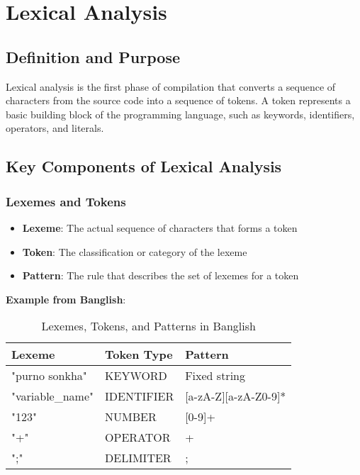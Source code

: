\documentclass[12pt,a4paper]{article}
\begin{document}
\section{Lexical Analysis}

\subsection{Definition and Purpose}

Lexical analysis is the first phase of compilation that converts a sequence of characters from the source code into a sequence of tokens. A token represents a basic building block of the programming language, such as keywords, identifiers, operators, and literals.

\subsection{Key Components of Lexical Analysis}

\subsubsection{Lexemes and Tokens}

\begin{itemize}
    \item \textbf{Lexeme}: The actual sequence of characters that forms a token
    \item \textbf{Token}: The classification or category of the lexeme
    \item \textbf{Pattern}: The rule that describes the set of lexemes for a token
\end{itemize}

\textbf{Example from Banglish}:
\begin{table}[H]
\centering
\begin{tabular}{|p{3.5cm}|p{3cm}|p{6cm}|}
\hline
\rowcolor{lightgray!30}
\textbf{Lexeme} & \textbf{Token Type} & \textbf{Pattern} \\
\hline
"purno sonkha" & KEYWORD & Fixed string \\
\hline
"variable\_name" & IDENTIFIER & [a-zA-Z][a-zA-Z0-9]* \\
\hline
"123" & NUMBER & [0-9]+ \\
\hline
"+" & OPERATOR & + \\
\hline
";" & DELIMITER & ; \\
\hline
\end{tabular}
\caption{Lexemes, Tokens, and Patterns in Banglish}
\end{table}
\end{document}
